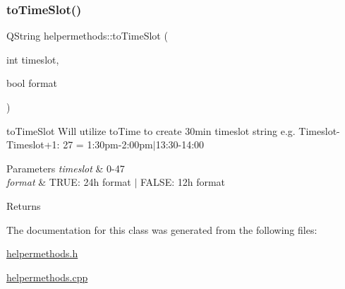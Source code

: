 \subsubsection{\texorpdfstring{to\+Time\+Slot()}{toTimeSlot()}}
{\footnotesize\ttfamily Q\+String helpermethods\+::to\+Time\+Slot (\begin{DoxyParamCaption}\item[{int}]{timeslot,  }\item[{bool}]{format }\end{DoxyParamCaption})\hspace{0.3cm}{\ttfamily [static]}}



to\+Time\+Slot Will utilize to\+Time to create 30min timeslot string e.\+g. Timeslot-\/\+Timeslot+1\+: 27 = 1\+:30pm-\/2\+:00pm$\vert$13\+:30-\/14\+:00 


\begin{DoxyParams}{Parameters}
{\em timeslot} & 0-\/47 \\
\hline
{\em format} & T\+R\+UE\+: 24h format $\vert$ F\+A\+L\+SE\+: 12h format \\
\hline
\end{DoxyParams}
\begin{DoxyReturn}{Returns}

\end{DoxyReturn}


The documentation for this class was generated from the following files\+:\begin{DoxyCompactItemize}
\item 
\hyperlink{helpermethods_8h}{helpermethods.\+h}\item 
\hyperlink{helpermethods_8cpp}{helpermethods.\+cpp}\end{DoxyCompactItemize}
